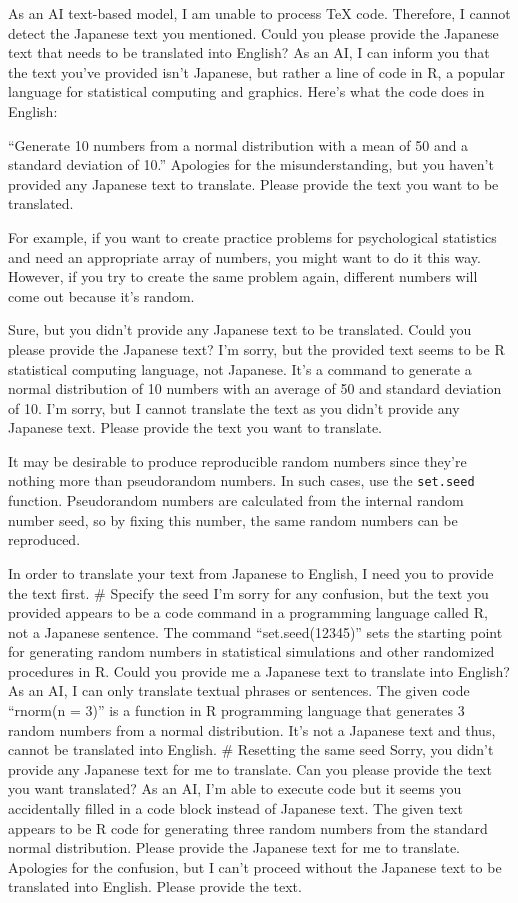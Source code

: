 \documentclass[
  a4paper,
]{book}
\begin{document}
As an AI text-based model, I am unable to process TeX code. Therefore, I
cannot detect the Japanese text you mentioned. Could you please provide
the Japanese text that needs to be translated into English? As an AI, I
can inform you that the text you've provided isn't Japanese, but rather
a line of code in R, a popular language for statistical computing and
graphics. Here's what the code does in English:

``Generate 10 numbers from a normal distribution with a mean of 50 and a
standard deviation of 10.'' Apologies for the misunderstanding, but you
haven't provided any Japanese text to translate. Please provide the text
you want to be translated.

For example, if you want to create practice problems for psychological
statistics and need an appropriate array of numbers, you might want to
do it this way. However, if you try to create the same problem again,
different numbers will come out because it's random.

Sure, but you didn't provide any Japanese text to be translated. Could
you please provide the Japanese text? I'm sorry, but the provided text
seems to be R statistical computing language, not Japanese. It's a
command to generate a normal distribution of 10 numbers with an average
of 50 and standard deviation of 10. I'm sorry, but I cannot translate
the text as you didn't provide any Japanese text. Please provide the
text you want to translate.

It may be desirable to produce reproducible random numbers since they're
nothing more than pseudorandom numbers. In such cases, use the
\texttt{set.seed} function. Pseudorandom numbers are calculated from the
internal random number seed, so by fixing this number, the same random
numbers can be reproduced.

In order to translate your text from Japanese to English, I need you to
provide the text first. \# Specify the seed I'm sorry for any confusion,
but the text you provided appears to be a code command in a programming
language called R, not a Japanese sentence. The command
``set.seed(12345)'' sets the starting point for generating random
numbers in statistical simulations and other randomized procedures in R.
Could you provide me a Japanese text to translate into English? As an
AI, I can only translate textual phrases or sentences. The given code
``rnorm(n = 3)'' is a function in R programming language that generates
3 random numbers from a normal distribution. It's not a Japanese text
and thus, cannot be translated into English. \# Resetting the same seed
Sorry, you didn't provide any Japanese text for me to translate. Can you
please provide the text you want translated? As an AI, I'm able to
execute code but it seems you accidentally filled in a code block
instead of Japanese text. The given text appears to be R code for
generating three random numbers from the standard normal distribution.
Please provide the Japanese text for me to translate. Apologies for the
confusion, but I can't proceed without the Japanese text to be
translated into English. Please provide the text.
\end{document}
